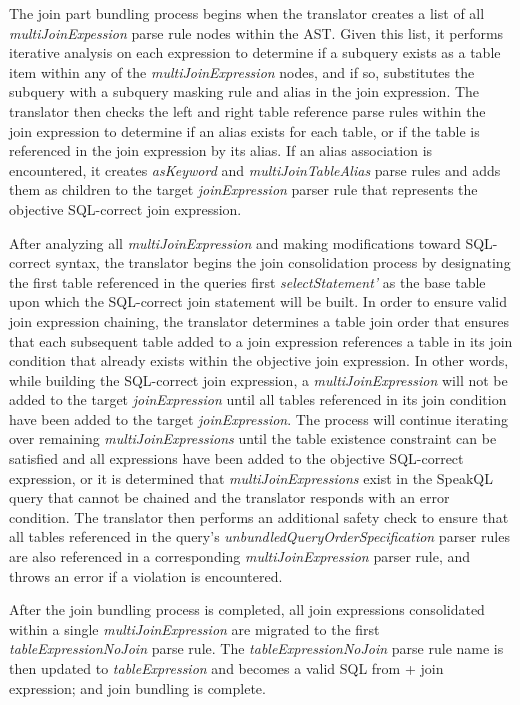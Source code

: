 
The join part bundling process begins when the translator creates a list of all \emph{multiJoinExpession} parse rule nodes within the AST. Given this list, it performs iterative analysis on each expression to determine if a subquery exists as a table item within any of the \emph{multiJoinExpression} nodes, and if so, substitutes the subquery with a subquery masking rule and alias in the join expression. The translator then checks the left and right table reference parse rules within the join expression to determine if an alias exists for each table, or if the table is referenced in the join expression by its alias. If an alias association is encountered, it creates \emph{asKeyword} and \emph{multiJoinTableAlias} parse rules and adds them as children to the target \emph{joinExpression} parser rule that represents the objective SQL-correct join expression.

After analyzing all \emph{multiJoinExpression} and making modifications toward SQL-correct syntax, the translator begins the join consolidation process by designating the first table referenced in the queries first \emph{selectStatement'} as the base table upon which the SQL-correct join statement will be built. In order to ensure valid join expression chaining, the translator determines a table join order that ensures that each subsequent table added to a join expression references a table in its join condition that already exists within the objective join expression. In other words, while building the SQL-correct join expression, a \emph{multiJoinExpression} will not be added to the target \emph{joinExpression} until all tables referenced in its join condition have been added to the target \emph{joinExpression}. The process will continue iterating over remaining \emph{multiJoinExpressions} until the table existence constraint can be satisfied and all expressions have been added to the objective SQL-correct expression, or it is determined that \emph{multiJoinExpressions} exist in the SpeakQL query that cannot be chained and the translator responds with an error condition. The translator then performs an additional safety check to ensure that all tables referenced in the query's \emph{unbundledQueryOrderSpecification} parser rules are also referenced in a corresponding \emph{multiJoinExpression} parser rule, and throws an error if a violation is encountered.

After the join bundling process is completed, all join expressions consolidated within a single \emph{multiJoinExpression} are migrated to the first \emph{tableExpressionNoJoin} parse rule. The \emph{tableExpressionNoJoin} parse rule name is then updated to \emph{tableExpression} and becomes a valid SQL from + join expression; and join bundling is complete.

